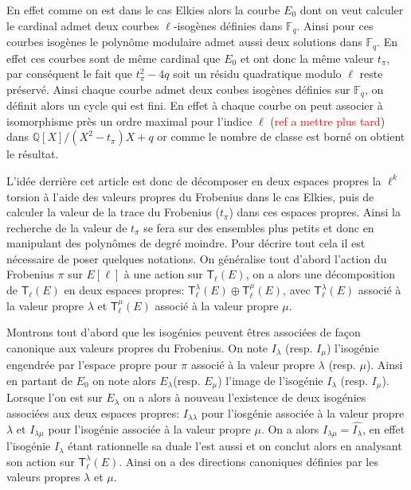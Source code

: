 \documentclass[10pt,a4paper]{book}
\theoremstyle{plain}
\theoremstyle{definition}
\theoremstyle{definition}
\theoremstyle{definition}
\theoremstyle{definition}
\theoremstyle{remark}
\theoremstyle{remark}
\theoremstyle{definition}
\begin{document}
En effet comme on est dans le cas Elkies alors la courbe $E_0$ dont on veut calculer le cardinal admet deux  courbes $\ell$-isogènes définies dans $\mathbb{F}_q$. Ainsi pour ces courbes isogènes le polynôme modulaire admet aussi deux solutions  dans $\mathbb{F}_q$. En effet ces courbes sont de même cardinal que $E_0$ et ont donc la même valeur $t_{\pi}$, par conséquent le fait que $t_{\pi}^2-4q$ soit un résidu quadratique modulo $\ell$ reste préservé. Ainsi chaque courbe admet deux coubes isogènes définies sur $\mathbb{F}_q$, on définit alors un cycle qui est fini. En effet à chaque courbe on peut associer à isomorphisme près un ordre maximal pour l'indice $\ell$ (\textcolor{red}{ref a mettre plus tard}) dans $\mathbb{Q}[X]/(X^2-t_{\pi})X+q$ or comme le nombre de classe est borné on obtient le résultat. 

L'idée derrière cet article est donc de décomposer en deux espaces propres la $\ell^k$ torsion à l'aide des valeurs propres du Frobenius dans le cas Elkies, puis de calculer la valeur de la trace du Frobenius ($t_{\pi}$) dans ces espaces propres. Ainsi la recherche de la valeur de $t_{\pi}$ se fera sur des ensembles plus petits et donc en manipulant des polynômes de degré moindre. Pour décrire tout cela il est nécessaire de poser quelques notations. On généralise tout d'abord l'action du Frobenius $\pi$ sur $E[\ell]$ à une action sur $\mathsf{T}_{\ell}(E)$, on a alors une décomposition de $\mathsf{T}_{\ell}(E)$ en deux espaces propres: $\mathsf{T}_{\ell}^{\lambda}(E) \oplus \mathsf{T}_{\ell}^{\mu}(E)$, avec $\mathsf{T}_{\ell}^{\lambda}(E)$ associé à la valeur propre $\lambda$ et $\mathsf{T}_{\ell}^{\mu}(E)$ associé à la valeur propre $\mu$. 


Montrons tout d'abord que les isogénies peuvent êtres associées de façon canonique aux valeurs propres du Frobenius. On note $I_{\lambda}$ (resp. $I_{\mu}$) l'isogénie engendrée par l'espace propre pour $\pi$ associé à la valeur propre $\lambda$ (resp. $\mu$). Ainsi en partant de $E_0$ on note alors $E_{\lambda}$(resp. $E_{\mu}$) l'image de l'isogénie $I_{\lambda}$ (resp. $I_{\mu}$). Lorsque l'on est sur $E_{\lambda}$ on a alors à nouveau l'existence de deux isogénies associées aux deux espaces propres: $I_{\lambda \lambda}$ pour l'iosgénie associée à la valeur propre $\lambda$ et $I_{\lambda \mu}$ pour l'isogénie associée à la valeur propre $\mu$. On a alors $I_{\lambda \mu}=\widehat{I_{\lambda}}$, en effet l'isogénie $I_{\lambda}$ étant rationnelle sa duale l'est aussi et on conclut alors en analysant son action sur $\mathsf{T}_{\ell}^{\lambda}(E)$. Ainsi on a des directions canoniques définies par les valeurs propres $\lambda$ et $\mu$. 
\end{document}
